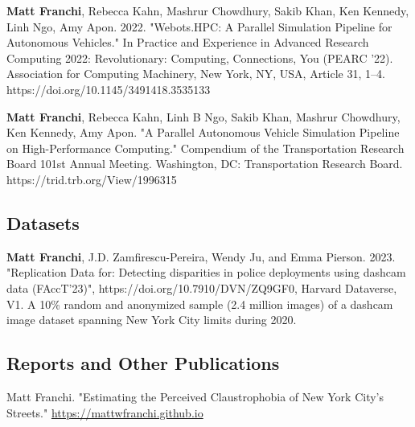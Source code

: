 \documentclass[11pt,letterpaper]{report}
\begin{document}
\begin{tablist}
        \item[\rule{2em}{0.4pt}]

        \item[2022.b] \tab{}\textbf{Matt Franchi}, Rebecca Kahn, Mashrur Chowdhury, Sakib Khan, Ken Kennedy, Linh Ngo, Amy Apon. 2022. "Webots.HPC: A Parallel Simulation Pipeline for Autonomous Vehicles." In Practice and Experience in Advanced Research Computing 2022: Revolutionary: Computing, Connections, You (PEARC '22). Association for Computing Machinery, New York, NY, USA, Article 31, 1–4. https://doi.org/10.1145/3491418.3535133

        \item[2022.a] \tab{}\textbf{Matt Franchi}, Rebecca Kahn, Linh B Ngo, Sakib Khan, Mashrur Chowdhury, Ken Kennedy, Amy Apon. "A Parallel Autonomous Vehicle Simulation Pipeline on High-Performance Computing." Compendium of the Transportation Research Board 101st Annual Meeting. Washington, DC: Transportation Research Board. https://trid.trb.org/View/1996315

    \end{tablist}

    \subsection*{Datasets}
    \begin{tablist}
        \item[2024.a] \tab{}\textbf{Matt Franchi}, J.D. Zamfirescu-Pereira, Wendy Ju, and Emma Pierson. 2023. "Replication Data for: Detecting disparities in police deployments using dashcam data (FAccT'23)", https://doi.org/10.7910/DVN/ZQ9GF0, Harvard Dataverse, V1. \newline A 10\% random and anonymized sample (2.4 million images) of a dashcam image dataset spanning \newline New York City limits during 2020.
    \end{tablist}


    \subsection*{Reports and Other Publications}

    \begin{tablist}

        \item[2024.a] \tab{}Matt Franchi. "Estimating the Perceived Claustrophobia of New York City's Streets." \href{https://mattwfranchi.github.io/claustrophobic-streets/}{https://mattwfranchi.github.io}

    \end{tablist}
\end{document}
